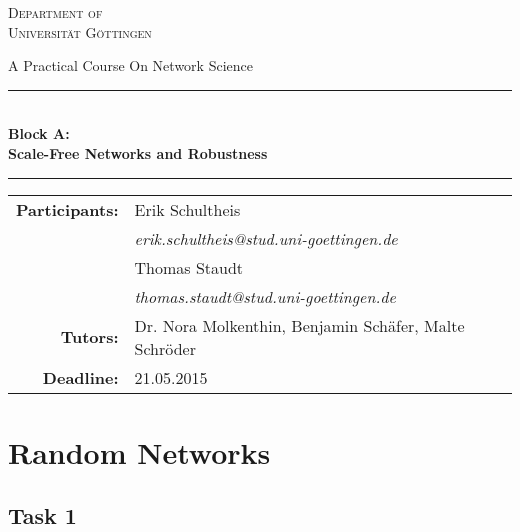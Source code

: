 \documentclass{scrartcl}
\begin{document}
\begin{titlepage}\centering
\textsc{\Large Department of \\[1.5ex] Universität Göttingen}

\vspace*{2cm}
{\Large A Practical Course On Network Science}
\vspace*{2cm}

\rule{\textwidth}{1pt}\\[0.5cm]
{\bfseries \huge Block A: \\[0.5cm] \huge \bfseries Scale-Free Networks and Robustness\\[0.5cm]}
\rule{\textwidth}{1pt}

\vspace*{4cm}

\begin{Large}\begin{tabular}{rl}
        \textbf{Participants:}  & Erik Schultheis                                \\    
                   & \textit{erik.schultheis@stud.uni-goettingen.de}\\[0.5cm]
                   & Thomas Staudt                                  \\
                   & \textit{thomas.staudt@stud.uni-goettingen.de}  \\[1.0cm]

       \textbf{Tutors:}        & Dr. Nora Molkenthin, Benjamin Schäfer, Malte Schröder  \\[1.0cm]
       \textbf{Deadline:}      & 21.05.2015
\end{tabular}\end{Large}

\vspace*{1.5cm}


\end{titlepage}

\tableofcontents
\clearpage

\section{Random Networks}
\subsection{Task 1}
\end{document}
